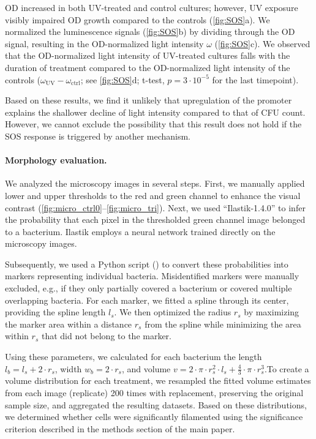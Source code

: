 OD increased in both UV-treated and control cultures; however, UV exposure visibly impaired OD growth compared to the controls (\autoref{fig:SOS}a).
We normalized the luminescence signals (\autoref{fig:SOS}b) by dividing through the OD signal, resulting in the OD-normalized light intensity $\omega$ (\autoref{fig:SOS}c).
We observed that the OD-normalized light intensity of UV-treated cultures falls with the duration of treatment compared to the OD-normalized light intensity of the controls ($\omega_\text{UV} - \omega_\text{ctrl}$; see \autoref{fig:SOS}d; t-test, $p = 3 \cdot 10^{-5}$ for the last timepoint).

Based on these results, we find it unlikely that upregulation of the promoter explains the shallower decline of light intensity compared to that of CFU count.
However, we cannot exclude the possibility that this result does not hold if the SOS response is triggered by another mechanism.

\paragraph{Morphology evaluation.}
We analyzed the microscopy images in several steps.
First, we manually applied lower and upper thresholds to the red and green channel to enhance the visual contrast (\autoref{fig:micro_ctrl0}--\autoref{fig:micro_tri}).
Next, we used ``Ilastik-1.4.0'' to infer the probability that each pixel in the thresholded green channel image belonged to a bacterium.
Ilastik employs a neural network trained directly on the microscopy images.

Subsequently, we used a Python script (\cite{soft_code}) to convert these probabilities into markers representing individual bacteria.
Misidentified markers were manually excluded, e.g., if they only partially covered a bacterium or covered multiple overlapping bacteria.
For each marker, we fitted a spline through its center, providing the spline length $l_s$.
We then optimized the radius $r_s$ by maximizing the marker area within a distance $r_s$ from the spline while minimizing the area within $r_s$ that did not belong to the marker.

Using these parameters, we calculated for each bacterium the length $l_b = l_s + 2 \cdot r_s$, width $w_b = 2 \cdot r_s$, and volume $v = 2 \cdot \pi \cdot r_s^2 \cdot l_s + \frac{4}{3} \cdot \pi \cdot r_s^3$.To create a volume distribution for each treatment, we resampled the fitted volume estimates from each image (replicate) 200 times with replacement, preserving the original sample size, and aggregated the resulting datasets.
Based on these distributions, we determined whether cells were significantly filamented using the significance criterion described in the methods section of the main paper.

